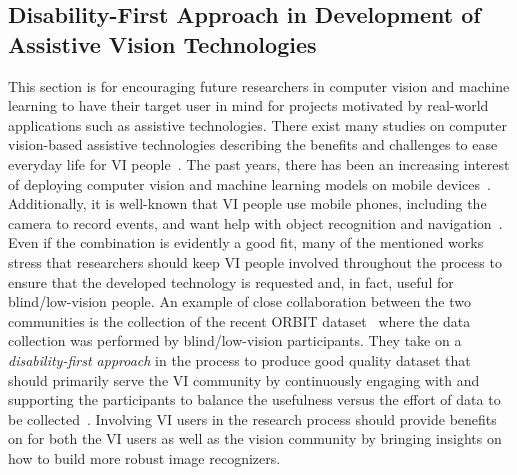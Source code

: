 \subsection{Disability-First Approach in Development of Assistive Vision Technologies}

This section is for encouraging future researchers in computer vision and machine learning to have their target user in mind for projects motivated by real-world applications such as assistive technologies.
There exist many studies on computer vision-based assistive technologies describing the benefits and challenges to ease everyday life for VI people~\cite{jayant2011supporting, tian2013toward, terven2013new, leo2017computer, tapu2020wearable, wang2019implications}.  
The past years, there has been an increasing interest of deploying computer vision and machine learning models on mobile devices~\cite{zhang2019deep, lim2020federated}. Additionally, it is well-known that VI people use mobile phones, including the camera to record events, and want help with object recognition and navigation~\cite{jayant2011supporting, vazquez2012helping, szpiro2016finding, gurari2018vizwiz}. 
Even if the combination is evidently a good fit, many of the mentioned works stress that researchers should keep VI people involved throughout the process to ensure that the developed technology is requested and, in fact, useful for blind/low-vision people. 
An example of close collaboration between the two communities is the collection of the recent ORBIT dataset~\cite{massiceti2021orbit, theodorou2021disability} where the data collection was performed by blind/low-vision participants. They take on a \textit{disability-first approach} in the process to produce good quality dataset that should primarily serve the VI community by continuously engaging with and supporting the participants to balance the usefulness versus the effort of data to be collected~\cite{theodorou2021disability}. Involving VI users in the research process should provide benefits on for both the VI users as well as the vision community by bringing insights on how to build more robust image recognizers. 

